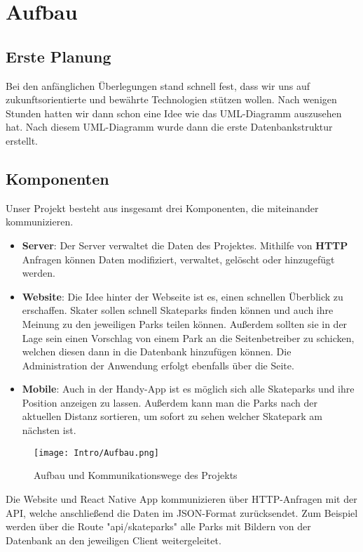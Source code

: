 \chapter{Aufbau}

\section{Erste Planung}
Bei den anfänglichen Überlegungen stand schnell fest, dass wir uns auf zukunftsorientierte und bewährte Technologien 
stützen wollen. Nach wenigen Stunden hatten wir dann schon eine Idee wie das
UML-Diagramm auszusehen hat. Nach diesem UML-Diagramm wurde dann die erste Datenbankstruktur erstellt.

\section{Komponenten}
Unser Projekt besteht aus insgesamt drei Komponenten, die miteinander kommunizieren.

\begin{itemize}
    \item \textbf{Server}: Der Server verwaltet die Daten des Projektes. Mithilfe von \textbf{HTTP}
    Anfragen können Daten modifiziert, verwaltet, gelöscht oder hinzugefügt werden.

    \item \textbf{Website}: Die Idee hinter der Webseite ist es, einen schnellen Überblick zu
    erschaffen. Skater sollen schnell Skateparks finden können und auch ihre Meinung zu den
    jeweiligen Parks teilen können. Außerdem sollten sie in der Lage sein einen Vorschlag von einem
    Park an die Seitenbetreiber zu schicken, welchen diesen dann in die Datenbank hinzufügen können.
    Die Administration der Anwendung erfolgt ebenfalls über die Seite.

    \item \textbf{Mobile}: Auch in der Handy-App ist es möglich sich alle Skateparks und ihre
    Position anzeigen zu lassen. Außerdem kann man die Parks nach der aktuellen Distanz sortieren,
    um sofort zu sehen welcher Skatepark am nächsten ist.
\end{itemize}

\begin{figure}[H]
  \begin{center}
    \texttt{[image: Intro/Aufbau.png]}
    \caption{Aufbau und Kommunikationswege des Projekts}
  \end{center}
\end{figure}

Die Website und React Native App kommunizieren über HTTP-Anfragen mit der API, welche anschließend
die Daten im JSON-Format zurücksendet. Zum Beispiel werden über die Route "api/skateparks" alle
Parks mit Bildern von der Datenbank an den jeweiligen Client weitergeleitet.